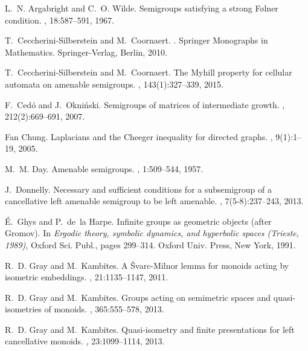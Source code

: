 \documentclass[11pt,a4paper,reqno]{amsart}
\begin{document}
 
\begin{thebibliography}{10}

L.~N. Argabright and C.~O. Wilde.
\newblock Semigroups satisfying a strong {F}\o lner condition.
, 18:587--591, 1967.

T.~Ceccherini-Silberstein and M.~Coornaert.
.
\newblock Springer Monographs in Mathematics. Springer-Verlag, Berlin, 2010.

T.~Ceccherini-Silberstein and M.~Coornaert.
\newblock The {M}yhill property for cellular automata on amenable semigroups.
, 143(1):327--339, 2015.

F.~Ced{\'o} and J.~Okni{\'n}ski.
\newblock Semigroups of matrices of intermediate growth.
, 212(2):669--691, 2007.

Fan Chung.
\newblock Laplacians and the {C}heeger inequality for directed graphs.
, 9(1):1--19, 2005.

M.~M. Day.
\newblock Amenable semigroups.
, 1:509--544, 1957.

J.~Donnelly.
\newblock Necessary and sufficient conditions for a subsemigroup of a
  cancellative left amenable semigroup to be left amenable.
, 7(5-8):237--243, 2013.

{\'E}.~Ghys and P.~de~la Harpe.
\newblock Infinite groups as geometric objects (after {G}romov).
\newblock In {\em Ergodic theory, symbolic dynamics, and hyperbolic spaces
  ({T}rieste, 1989)}, Oxford Sci. Publ., pages 299--314. Oxford Univ. Press,
  New York, 1991.

R.~D. Gray and M.~Kambites.
\newblock A \v{S}varc-{M}ilnor lemma for monoids acting by isometric
  embeddings.
, 21:1135--1147, 2011.

R.~D. Gray and M.~Kambites.
\newblock Groups acting on semimetric spaces and quasi-isometries of monoids.
, 365:555--578, 2013.

R.~D. Gray and M.~Kambites.
\newblock Quasi-isometry and finite presentations for left cancellative
  monoids.
, 23:1099--1114, 2013.


\end{thebibliography}
\end{document}
